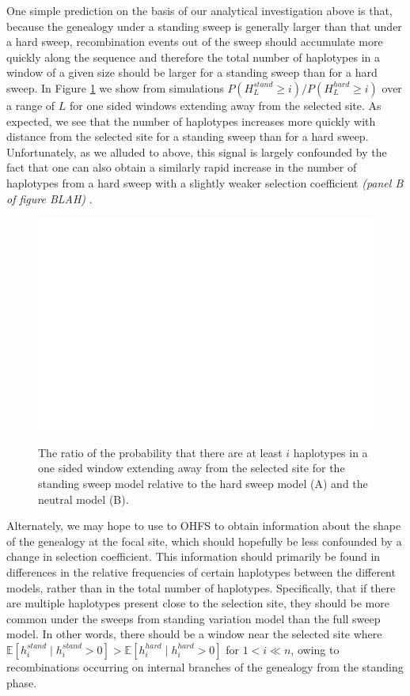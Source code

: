 \documentclass[a4paper,10pt]{article}
\newcommand{\jb}[1]{{\it\color{blue} (#1)} }
\begin{document}
One simple prediction on the basis of our analytical investigation above is that, because the genealogy under a standing sweep is generally larger than that under a hard sweep, recombination events out of the sweep should accumulate more quickly along the sequence and therefore the total number of haplotypes in a window of a given size should be larger for a standing sweep than for a hard sweep. In Figure \ref{hap-exist-probs} we show from simulations $P\left(H_L^{stand} \geq i \right)/P\left(H_L^{hard} \geq i \right)$ over a range of $L$ for one sided windows extending away from the selected site. As expected, we see that the number of haplotypes increases more quickly with distance from the selected site for a standing sweep than for a hard sweep. Unfortunately, as we alluded to above, this signal is largely confounded by the fact that one can also obtain a similarly rapid increase in the number of haplotypes from a hard sweep with a slightly weaker selection coefficient \jb{panel B of figure BLAH}.

\begin{figure}
		\includegraphics[width = \textwidth]{../Paper_Figures/HapFreqsExistProb.pdf} \label{hap-exist-probs}
	\caption{The ratio of the probability that there are at least $i$ haplotypes in a one sided window extending away from the selected site for the standing sweep model relative to the hard sweep model (A) and the neutral model (B).}
\end{figure}

Alternately, we may hope to use to OHFS to obtain information about the shape of the genealogy at the focal site, which should hopefully be less confounded by a change in selection coefficient. This information should primarily be found in differences in the relative frequencies of certain haplotypes between the different models, rather than in the total number of haplotypes. Specifically, that if there are multiple haplotypes present close to the selection site,  they should be more common under the sweeps from standing variation model than the full sweep model. In other words, there should be a window near the selected site where $\mathbb{E}[h_i^{stand} \mid h_i^{stand} > 0] > \mathbb{E}[h_i^{hard} \mid h_i^{hard} > 0]$ for $1 < i \ll n$, owing to recombinations occurring on internal branches of the genealogy from the standing phase. 
\end{document}
